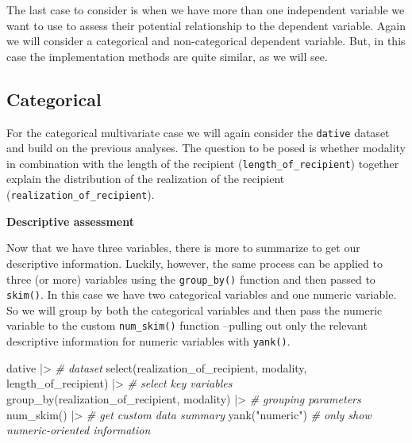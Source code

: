 \documentclass[
  letterpaper,
]{latex/krantz}
\newenvironment{Shaded}{\begin{snugshade}}{\end{snugshade}}
\newcommand{\CommentTok}[1]{\textcolor[rgb]{0.00,0.00,0.00}{\textit{#1}}}
\newcommand{\FunctionTok}[1]{\textcolor[rgb]{0.00,0.00,0.00}{#1}}
\newcommand{\NormalTok}[1]{\textcolor[rgb]{0.00,0.00,0.00}{#1}}
\newcommand{\SpecialCharTok}[1]{\textcolor[rgb]{0.00,0.00,0.00}{#1}}
\newcommand{\StringTok}[1]{\textcolor[rgb]{0.00,0.00,0.00}{#1}}
\begin{document}
The last case to consider is when we have more than one independent
variable we want to use to assess their potential relationship to the
dependent variable. Again we will consider a categorical and
non-categorical dependent variable. But, in this case the implementation
methods are quite similar, as we will see.

\hypertarget{categorical-2}{%
\subsection{Categorical}\label{categorical-2}}

For the categorical multivariate case we will again consider the
\texttt{dative} dataset and build on the previous analyses. The question
to be posed is whether modality in combination with the length of the
recipient (\texttt{length\_of\_recipient}) together explain the
distribution of the realization of the recipient
(\texttt{realization\_of\_recipient}).

\textbf{Descriptive assessment}

Now that we have three variables, there is more to summarize to get our
descriptive information. Luckily, however, the same process can be
applied to three (or more) variables using the \texttt{group\_by()}
function and then passed to \texttt{skim()}. In this case we have two
categorical variables and one numeric variable. So we will group by both
the categorical variables and then pass the numeric variable to the
custom \texttt{num\_skim()} function --pulling out only the relevant
descriptive information for numeric variables with \texttt{yank()}.

\begin{Shaded}
\begin{Highlighting}[]
\NormalTok{dative }\SpecialCharTok{|\textgreater{}} \CommentTok{\# dataset}
  \FunctionTok{select}\NormalTok{(realization\_of\_recipient, modality, length\_of\_recipient) }\SpecialCharTok{|\textgreater{}} \CommentTok{\# select key variables}
  \FunctionTok{group\_by}\NormalTok{(realization\_of\_recipient, modality) }\SpecialCharTok{|\textgreater{}} \CommentTok{\# grouping parameters}
  \FunctionTok{num\_skim}\NormalTok{() }\SpecialCharTok{|\textgreater{}} \CommentTok{\# get custom data summary}
  \FunctionTok{yank}\NormalTok{(}\StringTok{"numeric"}\NormalTok{) }\CommentTok{\# only show numeric{-}oriented information}
\end{Highlighting}
\end{Shaded}
\end{document}
